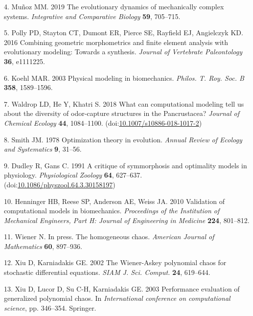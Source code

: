 \documentclass[
]{article}
\begin{document}
\leavevmode\hypertarget{ref-Munoz:2019}{}%
4. Muñoz MM. 2019 The evolutionary dynamics of mechanically complex
systems. \emph{Integrative and Comparative Biology} \textbf{59},
705--715.

\leavevmode\hypertarget{ref-Polly:2016}{}%
5. Polly PD, Stayton CT, Dumont ER, Pierce SE, Rayfield EJ, Angielczyk
KD. 2016 Combining geometric morphometrics and finite element analysis
with evolutionary modeling: Towards a synthesis. \emph{Journal of
Vertebrate Paleontology} \textbf{36}, e1111225.

\leavevmode\hypertarget{ref-Koehl:2003}{}%
6. Koehl MAR. 2003 Physical modeling in biomechanics. \emph{Philos. T.
Roy. Soc. B} \textbf{358}, 1589--1596.

\leavevmode\hypertarget{ref-Waldrop:entmodel}{}%
7. Waldrop LD, He Y, Khatri S. 2018 What can computational modeling tell
us about the diversity of odor-capture structures in the Pancrustacea?
\emph{Journal of Chemical Ecology} \textbf{44}, 1084--1100.
(doi:\href{https://doi.org/10.1007/s10886-018-1017-2}{10.1007/s10886-018-1017-2})

\leavevmode\hypertarget{ref-Smith:1978}{}%
8. Smith JM. 1978 Optimization theory in evolution. \emph{Annual Review
of Ecology and Systematics} \textbf{9}, 31--56.

\leavevmode\hypertarget{ref-Dudley:1991}{}%
9. Dudley R, Gans C. 1991 A critique of symmorphosis and optimality
models in physiology. \emph{Physiological Zoology} \textbf{64},
627--637.
(doi:\href{https://doi.org/10.1086/physzool.64.3.30158197}{10.1086/physzool.64.3.30158197})

\leavevmode\hypertarget{ref-Henninger:2010}{}%
10. Henninger HB, Reese SP, Anderson AE, Weiss JA. 2010 Validation of
computational models in biomechanics. \emph{Proceedings of the
Institution of Mechanical Engineers, Part H: Journal of Engineering in
Medicine} \textbf{224}, 801--812.

\leavevmode\hypertarget{ref-Wiener:1938}{}%
11. Wiener N. In press. The homogeneous chaos. \emph{American Journal of
Mathematics} \textbf{60}, 897--936.

\leavevmode\hypertarget{ref-Xiu2002}{}%
12. Xiu D, Karniadakis GE. 2002 The Wiener-Askey polynomial chaos for
stochastic differential equations. \emph{SIAM J. Sci. Comput.}
\textbf{24}, 619--644.

\leavevmode\hypertarget{ref-XiuLucorK2003}{}%
13. Xiu D, Lucor D, Su C-H, Karniadakis GE. 2003 Performance evaluation
of generalized polynomial chaos. In \emph{International conference on
computational science}, pp. 346--354. Springer.
\end{document}
